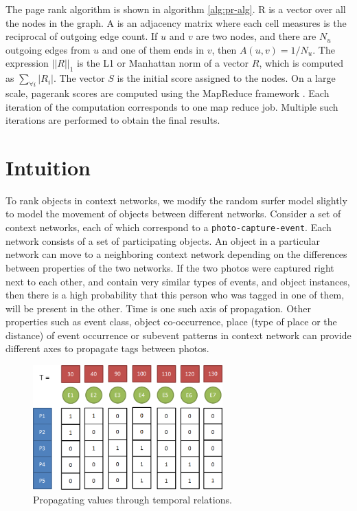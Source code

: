 The page rank algorithm is shown in algorithm \ref{alg:pr-alg}. R is a vector over all the nodes in the graph. A is an adjacency matrix where each cell measures is the reciprocal of outgoing edge count. If $u$ and $v$ are two nodes, and there are $N_u$ outgoing edges from $u$ and one of them ends in $v$, then $A(u, v) = 1/N_u$. The expression $||R||_1$ is the L1 or Manhattan norm of a vector $R$, which is computed as $\sum_{\forall i} |R_i|$. The vector $S$ is the initial score assigned to the nodes. On a large scale, pagerank scores are computed using the MapReduce framework \cite{dean2008mapreduce}. Each iteration of the computation corresponds to one map reduce job. Multiple such iterations are performed to obtain the final results.

\section{Intuition}

To rank objects in context networks, we modify the random surfer model slightly to model the movement of objects between different networks. Consider a set of context networks, each of which correspond to a \texttt{photo-capture-event}. Each network consists of a set of participating objects. An object in a particular network can move to a neighboring context network depending on the differences between properties of the two networks. If the two photos were captured right next to each other, and contain very similar types of events, and object instances, then there is a high probability that this person who was tagged in one of them, will be present in the other. Time is one such axis of propagation. Other properties such as event class, object co-occurrence, place (type of place or the distance) of event occurrence or subevent patterns in context network can provide different axes to propagate tags between photos.

\begin{figure}[t]
\centering
\includegraphics[width=0.65\textwidth]{media/chapter6/time-example-2.png}
\caption{Propagating values through temporal relations.}
\label{fig:time-example}
\end{figure}

